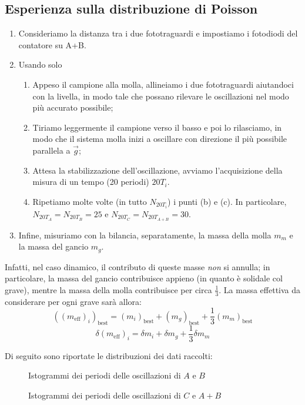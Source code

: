 \documentclass{article}
\newcommand*{\best}[1]{{#1}_\text{best}}
\begin{document}
\subsection{Esperienza sulla distribuzione di Poisson}
\begin{enumerate}
    \item Consideriamo la distanza tra i due fototraguardi e impostiamo i fotodiodi
          del contatore su A+B.
    \item Usando solo
    \begin{enumerate}
        \item Appeso il campione alla molla, allineiamo i due fototraguardi
              aiutandoci con la livella, in modo tale che possano rilevare
              le oscillazioni nel modo più accurato possibile;
        \item Tiriamo leggermente il campione verso il basso e poi lo rilasciamo,
              in modo che il sistema molla inizi a oscillare con direzione
              il più possibile parallela a $\vec{g}$;
        \item Attesa la stabilizzazione dell’oscillazione, avviamo
              l'acquisizione della misura di un tempo (20 periodi)
              $20T_i$.
        \item Ripetiamo molte volte (in tutto $N_{20T_i}$) i punti
              (b) e (c). In particolare, $N_{20T_A} = N_{20T_B} = 25$
              e $N_{20T_C} = N_{20T_{A+B}} = 30$.
    \end{enumerate}
    \item Infine, misuriamo con la bilancia, separatamente,
          la massa della molla $m_m$ e la massa del gancio $m_g$.
\end{enumerate}

Infatti, nel caso dinamico, il contributo di queste masse
\emph{non} si annulla; in particolare, la massa del gancio
contribuisce appieno (in quanto è solidale col grave),
mentre la massa della molla contribuisce per circa
$\frac{1}{3}$. La massa effettiva da considerare per ogni grave
sarà allora:
\[\best{\left(\left(m_\text{eff}\right)_i\right)} = \best{\left(m_i\right)} + \best{\left(m_g\right)} + \frac{1}{3}\best{\left(m_m\right)}\]
\[\delta \left(m_\text{eff}\right)_i = \delta m_i + \delta m_g + \frac{1}{3}\delta m_m\]

Di seguito sono riportate le distribuzioni dei dati raccolti:

\begin{figure}[H]
    \caption{Istogrammi dei periodi delle oscillazioni di $A$ e $B$}
\end{figure}\begin{figure}[H]
    \caption{Istogrammi dei periodi delle oscillazioni di $C$ e $A+B$}
\end{figure}
\end{document}
